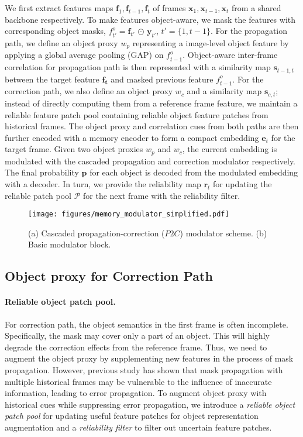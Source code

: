 \documentclass[letterpaper]{article} \usepackage{aaai22}  \usepackage{times}  \usepackage{helvet}  \usepackage{courier}  \usepackage[hyphens]{url}  \usepackage{graphicx} \urlstyle{rm} \def\UrlFont{\rm}  \usepackage{natbib}  \usepackage{caption} \DeclareCaptionStyle{ruled}{labelfont=normalfont,labelsep=colon,strut=off} \frenchspacing  \setlength{\pdfpagewidth}{8.5in}  \setlength{\pdfpageheight}{11in}  \usepackage{algorithm}
\begin{document}
We first extract features maps $\mathbf{f}_1, \mathbf{f}_{t-1}, \mathbf{f}_t$ of frames $\mathbf{x}_1, \mathbf{x}_{t-1}, \mathbf{x}_t$ from a shared backbone respectively.
To make features object-aware, we mask the features with corresponding object masks, $\mathit{f}_{t'}^{o} = \mathbf{f}_{t'}$ $\odot$ $\mathbf{y}_{t'}$, $t'=\{1,t-1\}$.
For the propagation path, we define an object proxy $w_{p}$ representing a image-level object feature by applying a global average pooling (GAP) on $\mathit{f}_{t-1}^o$. Object-aware inter-frame correlation for propagation path is then represented with a similarity map $\mathbf{s}_{t-1, t}$ between the target feature $\mathbf{f_t}$ and masked previous feature $\mathit{f}_{t-1}^o$.
For the correction path, we also define an object proxy $w_{c}$ and a similarity map $\mathbf{s}_{c, t}$; instead of directly computing them from a reference frame feature, we maintain a reliable feature patch pool containing reliable object feature patches from historical frames.
The object proxy and correlation cues from both paths are then further encoded with a memory encoder to form a compact embedding $\mathbf{e}_t$ for the target frame. Given two object proxies $w_{p}$ and $w_c$, the current embedding is modulated with the cascaded propagation and correction modulator respectively. 
The final probability $\mathbf{p}$ for each object is decoded from the modulated embedding with a decoder. 
In turn, we provide the reliability map $\mathbf{r}_t$ for updating the reliable patch pool $\mathcal{P}$ for the next frame with the reliability filter.

\begin{figure}[t!]
		\centering
		\texttt{[image: figures/memory\_modulator\_simplified.pdf]}
		\caption{(a) Cascaded propagation-correction ($P2C$) modulator scheme. (b) Basic modulator block.}
		\label{fig:Mem_modu_simplified} 
\end{figure}	
 
\subsection{Object proxy for Correction Path}
\paragraph{Reliable object patch pool.}
For correction path, the object semantics in the first frame is often incomplete. Specifically, the mask may cover only a part of an object. This will highly degrade the correction effects from the reference frame.
Thus, we need to augment the object proxy by supplementing new features in the process of mask propagation. However, previous study \cite{wu2020memory} has shown that mask propagation with multiple historical frames may be vulnerable to the influence of inaccurate information, leading to error propagation. 
To augment object proxy with historical cues while suppressing error propagation, we introduce a \textit{reliable object patch pool} for updating useful feature patches for object representation augmentation and a \textit{reliability filter} to filter out uncertain feature patches.
\end{document}
